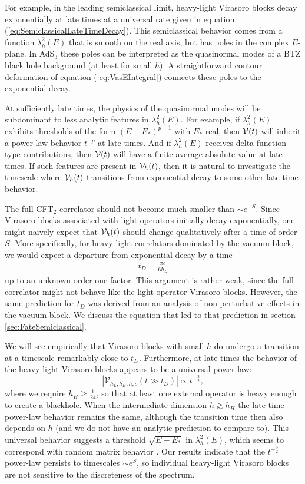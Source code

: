 \documentclass[12pt]{article}
\numberwithin{equation}{section}
\newcommand{\be}{\begin{eqnarray}}
\newcommand{\ee}{\end{eqnarray}}
\newcommand{\CV}{{\cal V}}
\begin{document}
For example, in the leading semiclassical limit, heavy-light Virasoro blocks decay exponentially at late times at a universal rate given in equation (\ref{eq:SemiclassicalLateTimeDecay}).   This semiclassical behavior comes from a function $\lambda_h^2(E)$ that is smooth on the real axis, but has poles in the complex $E$-plane. In AdS$_3$ these poles can be interpreted as the quasinormal modes of a BTZ black hole background (at least for small $h$).  A straightforward contour deformation of equation (\ref{eq:VasEIntegral}) connects these poles to the exponential decay.

At sufficiently late times, the physics of the quasinormal modes will be subdominant to less analytic features in $\lambda_h^2(E)$.  For example, if $\lambda_h^2(E)$ exhibits thresholds of the form  $(E-E_*)^{p-1}$ with $E_*$ real, then $\CV(t)$ will inherit a power-law behavior $t^{-p}$ at late times.  And if $\lambda_h^2(E)$ receives delta function type contributions, then $\CV(t)$ will have a finite average absolute value at late times.  If such features are present in $\CV_h(t)$, then it is natural to investigate the timescale where $\CV_h(t)$ transitions from exponential decay to some other late-time behavior.  

The full CFT$_2$ correlator should not become much smaller than $\sim e^{-S}$.  Since Virasoro blocks associated with light operators initially decay exponentially, one might naively expect that $\CV_h(t)$ should change qualitatively after a time of order $S$.  More specifically, for heavy-light correlators dominated by the vacuum block, we would expect a departure from exponential decay by a time
\be\label{eq:deftD}
t_D = \frac{\pi c}{6 h_L}
\ee
up to an unknown order one factor.   This argument is rather weak, since the full correlator might not behave like the light-operator Virasoro blocks.  However, the same prediction for $t_D$ was derived from an analysis of non-perturbative effects \cite{Fitzpatrick:2016ive} in the vacuum block.  We discuss the equation that led to that prediction in section \ref{sec:FateSemiclassical}.

We will see empirically that Virasoro blocks with small $h$ do undergo a transition at a timescale remarkably close to $t_D$.  Furthermore, at late times the behavior of the heavy-light Virasoro blocks appears to be a universal power-law:
\begin{equation}
|\mathcal{V}_{h_{L},h_{H},h,c}\left(t\gg t_D\right)| \propto t^{-\frac{3}{2}},
\end{equation}
where we require $h_H\ge\frac{1}{24}$, so that at least one external operator is heavy enough to create a blackhole.  When the intermediate dimension $h \gtrsim h_H$ the late time power-law behavior remains the same, although the transition time then also depends on $h$ (and we do not have an analytic prediction to compare to).  This universal behavior suggests a threshold $\sqrt{E - E_*}$ in $\lambda_h^2(E)$, which seems to correspond with random matrix behavior \cite{Guhr:1997ve, Cotler:2016fpe, Garcia-Garcia:2016mno}.  Our results indicate that  the $t^{-\frac{3}{2}}$ power-law persists to timescales $\sim e^S$, so individual heavy-light Virasoro blocks are not sensitive to the discreteness of the spectrum.
\end{document}
